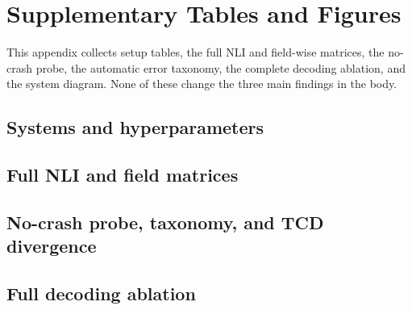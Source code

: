 \section{Supplementary Tables and Figures}
\label{sec:appendix}

This appendix collects setup tables, the full NLI and field-wise matrices, the no-crash probe, the automatic error taxonomy, the complete decoding ablation, and the system diagram. None of these change the three main findings in the body.

\subsection{Systems and hyperparameters}
\label{sec:app-setup}




\subsection{Full NLI and field matrices}
\label{sec:app-nli}



\subsection{No-crash probe, taxonomy, and TCD divergence}
\label{sec:app-errors}





\subsection{Full decoding ablation}
\label{sec:app-ablation}


